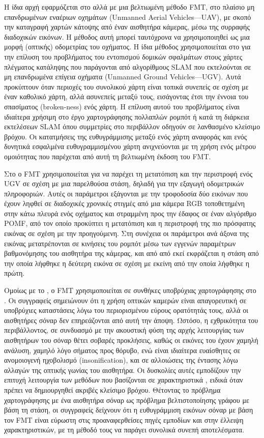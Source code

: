 Η ίδια αρχή εφαρμόζεται στο \cite{Bulow2009} αλλά με μια βελτιωμένη μέθοδο FMT,
στο πλαίσιο μη επανδρωμένων εναέριων οχημάτων (Unmanned Aerial Vehicles---UAV),
με σκοπό την καταγραφή χαρτών κάτοψης από έναν αισθητήρα κάμερας, μέσω της
συρραφής διαδοχικών εικόνων. Η μέθοδος αυτή μπορεί ταυτόχρονα να χρησιμοποιηθεί
ως μια μορφή (οπτικής) οδομετρίας του οχήματος. Η ίδια μέθοδος χρησιμοποιείται
στο \cite{Birk2010} για την επίλυση του προβλήματος του εντοπισμού δομικών
σφαλμάτων στους χάρτες πλέγματος κατάληψης που παράγονται από αλγορίθμους SLAM
που εκτελούνται σε μη επανδρωμένα επίγεια οχήματα (Unmanned Ground
Vehicles---UGV). Αυτά προκύπτουν όταν περιοχές του συνολικού χάρτη είναι τοπικά
συνεπείς σε σχέση με έναν καθολικό χάρτη, αλλά ασυνεπείς μεταξύ τους,
εισάγοντας έτσι την έννοια του σπασίματος (broken-ness) ενός χάρτη. Η επίλυση
αυτού του προβλήματος είναι ιδιαίτερα χρήσιμη στο έργο χαρτογράφησης πολλαπλών
ρομπότ ή κατά τη διάρκεια εκτελέσεων SLAM όπου συμμετρίες στο περιβάλλον
οδηγούν σε λανθασμένο κλείσιμο βρόχου. Οι κατατμήσεις της ευθυγράμμισης μεταξύ
ενός χάρτη αναφοράς και ενός δυνητικά εσφαλμένα ευθυγραμμισμένου χάρτη
ανιχνεύονται με τη χρήση ενός μέτρου ομοιότητας που παρέχεται από αυτή τη
βελτιωμένη έκδοση του FMT.

Στο \cite{Kazik2011} ο FMT χρησιμοποιείται για να παρέχει τη μετατόπιση και την
περιστροφή ενός UGV σε σχέση με μια παρελθούσα στάση, δηλαδή για την εξαγωγή
οδομετρικών πληροφοριών. Αυτές οι παράμετροι εξάγονται με την τροφοδοσία δύο
εικόνων που έχουν ληφθεί σε διαδοχικές χρονικές στιγμές από μια κάμερα RGB
τοποθετημένη στην κάτω πλευρά ενός οχήματος και στραμμένη προς την έδαφος σε
έναν αλγόριθμο POMF, από τον οποίο προκύπτει η μετατόπιση και η περιστροφή της
πιο πρόσφατης εικόνας σε σχέση με την προηγούμενη. Στη συνέχεια οι παράμετροι
ανά άξονα της εικόνας μετατρέπονται σε κινήσεις του ρομπότ μέσω των εγγενών
παραμέτρων βαθμονόμησης του αισθητήρα της κάμερας, και από από εκεί εκφράζεται
η στάση από την οποία λήφθηκε η δεύτερη εικόνα σε σχέση με εκείνη από την οποία
λήφθηκε η πρώτη.

Ομοίως με το \cite{Bulow2010}, ο FMT χρησιμοποιείται σε συνθήκες υποβρύχιας
χαρτογράφησης στο \cite{Hurtos2012}. Οι συγγραφείς σημειώνουν ότι η χρήση
οπτικών καμερών είναι απαγορευτική σε υποβρύχιες καταστάσεις λόγω του
περιορισμένου εύρους ορατότητάς τους, αλλά οι αισθητήρες σόναρ δεν επηρεάζονται
από αυτή την άποψη. Ωστόσο, η εχθρικότητα του περιβάλλοντος, σε συνδυασμό με
την ακουστική φύση της αρχής λειτουργίας των αισθητήρων του σόναρ θέτει σοβαρές
προκλήσεις, καθώς οι εικόνες του έχουν χαμηλή ανάλυση, χαμηλό λόγο σήματος προς
θόρυβο, ενώ είναι ιδιαίτερα ευαίσθητες σε ανομοιογενή ηχοβολισμό
(insonification), και σε αλλοιώσεις της έντασης λόγω αλλαγών της οπτικής γωνίας
του αισθητήρα. Οι δυσκολίες αυτές εμποδίζουν την επιτυχή λειτουργία των μεθόδων
που βασίζονται σε χαρακτηριστικά \cite{Kim2005,Lowe2004}, ειδικά όταν πρέπει
να δημιουργηθεί ακριβές κλείσιμο βρόχου. Θέτοντας το πρόβλημα χαρτογράφησης
με ένα αισθητήρα σόναρ ως πρόβλημα βελτιστοποίησης γράφου με βάση τη στάση, οι
συγγραφείς δείχνουν ότι η ευθυγράμμιση εικόνων σόναρ με βάση τον FMT είναι
εύρωστη στις προαναφερθείσες πηγές εμποδίων και στην έλλειψη χαρακτηριστικών,
με τη μέθοδό τους να παράγει συνολικά συνεπή αποτελέσματα.

